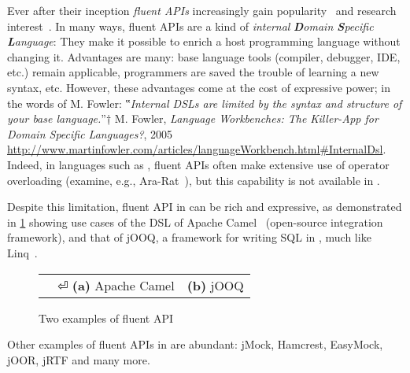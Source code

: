 Ever after their inception \emph{fluent APIs}
  increasingly gain popularity~\cite{Bauer:2005,Freeman:Pryce:06,Larsen:2012} and research
  interest~\cite{Deursen:2000,Kabanov:2008}.
In many ways, fluent APIs are a kind of
  \emph{internal} \emph{\textbf Domain \textbf Specific \textbf Language}:
They make it possible to enrich a host programming language without changing it.
Advantages are many: base language tools (compiler, debugger, IDE, etc.) remain
  applicable, programmers are saved the trouble of learning a new syntax, etc.
However, these advantages come at the cost of expressive power;
  in the words of M. Fowler:
  ‟\emph{Internal DSLs are limited by the syntax and structure of your base language.}”†
  {M. Fowler, \emph{Language Workbenches: The Killer-App for Domain Specific Languages?}, 
    2005
    \newline
  \url{http://www.martinfowler.com/articles/languageWorkbench.html\#InternalDsl}}.
Indeed, in languages such as \CC, fluent APIs
  often make extensive use of operator overloading (examine, e.g., \textsf{Ara-Rat}~\cite{Gil:Lenz:07}),
  but this capability is not available in \Java.

Despite this limitation, fluent API in \Java can be rich and expressive, as demonstrated
  in \cref{Figure:DSL} showing use cases of the DSL of Apache Camel~\cite{Ibsen:Anstey:10}
(open-source integration framework),
and that of jOOQ, a framework for writing
  SQL in \Java, much like Linq~\cite{Meijer:Beckman:Bierman:06}.

\begin{figure}[H]
  \caption{\label{Figure:DSL} Two examples of \Java fluent API}
  \begin{tabular}{@{}c@{}c@{}}
    \parbox[c]{44ex}{} &
    \hspace{-3ex} \parbox[c]{59ex}{} ⏎
    \textbf{(a)} Apache Camel                                          & \textbf{(b)} jOOQ
  \end{tabular}
\end{figure}

Other examples of fluent APIs in \Java are abundant: 
  jMock\cite{Freeman:Pryce:06}, 
  Hamcrest,
  EasyMock,
  jOOR,
  jRTF
  and many more.

